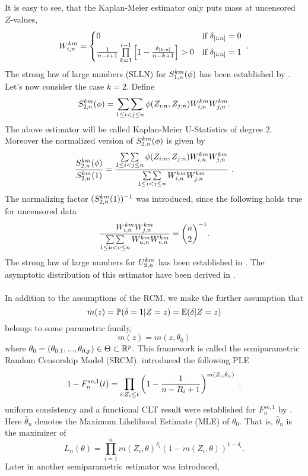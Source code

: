 It is easy to see, that the Kaplan-Meier estimator only puts mass at uncensored $Z$-values, \ie 
\[ W_{i,n}^{km} = \begin{cases} 
0 & \textrm{if } \delta_{[i:n]} = 0 \\
\frac{1}{n-i+1}\prod\limits_{k=1}^{i-1}\left[1-\frac{\delta_{[k:n]}}{n-k+1}\right] > 0 & \textrm{if } \delta_{[i:n]} = 1
\end{cases}\textrm{ .}
\]
%
The strong law of large numbers (SLLN) for $S_{1,n}^{km}(\phi)$ has been established by \citet{stute1993strong}.
%
Let's now consider the case $k=2$. Define
\begin{equation*}
S_{2,n}^{km}(\phi) = \mathop{\sum\sum}\limits_{1\leq i < j \leq n} \phi(Z_{i:n}, Z_{j:n}) W_{i,n}^{km} W_{j,n}^{km}.
\end{equation*}
The above estimator will be called Kaplan-Meier U-Statistics of degree 2. Moreover the normalized version of $S_{2,n}^{km}(\phi)$ is given by
$$\frac{S_{2,n}^{km}(\phi)}{S_{2,n}^{km}(1)} = \frac{\mathop{\sum\sum}\limits_{1\leq i < j \leq n} \phi(Z_{i:n}, Z_{j:n}) W_{i,n}^{km} W_{j,n}^{km}}{\mathop{\sum\sum}\limits_{1\leq i < j \leq n} W_{i,n}^{km} W_{j,n}^{km}}\textrm{ .}$$  
The normalizing factor $(S_{2,n}^{km}(1))^{-1}$ was introduced, since the following holds true for uncensored data
$$\frac{W_{i,n}^{km}W_{j,n}^{km}}{\mathop{\sum\sum}\limits_{1\leq u < v \leq n}W_{u,n}^{km}W_{v,n}^{km}} = \binom{n}{2}^{-1}\textrm{.}$$
The strong law of large numbers for $U_{2,n}^{km}$ has been established in \citet{bose1999strong}.
The asymptotic distribution of this estimator have been derived in \citet{bose2002asymptotic}. \\
\\
In addition to the assumptions of the RCM, we make the further assumption that 
$$m(z) = \mathbb{P}(\delta=1|Z=z) = \mathbb{E}(\delta|Z=z)$$
belongs to some parametric family, \ie\
$$m(z) = m(z,\theta_0)$$
where $\theta_0=(\theta_{0,1},...,\theta_{0,p})\in \Theta \subset \mathbb{R}^p$. This framework is called the semiparametric Random Censorship Model (SRCM).
%
\cite{dikta1998semiparametric} introduced the following PLE
$$1-F_n^{se,1}(t) = \prod\limits_{i:Z_i\leq t}\left(1-\frac{1}{n-R_i+1}\right)^{m(Z_i,\hat{\theta}_n)}\textrm{ .}$$
uniform consistency and a functional CLT result were established for $F_n^{se,1}$ by \cite{dikta1998semiparametric}. Here $\hat{\theta}_n$ denotes the Maximum Likelihood Estimate (MLE) of $\theta_0$. That is, $\hat{\theta}_n$ is the maximizer of 
$$L_n(\theta)=\prod\limits_{i=1}^{n} m(Z_i,\theta)^{\delta_i}(1-m(Z_i,\theta))^{1-\delta_i}.$$
Later in \cite{dikta2000strong} another semiparametric estimator was introduced, \ie\
